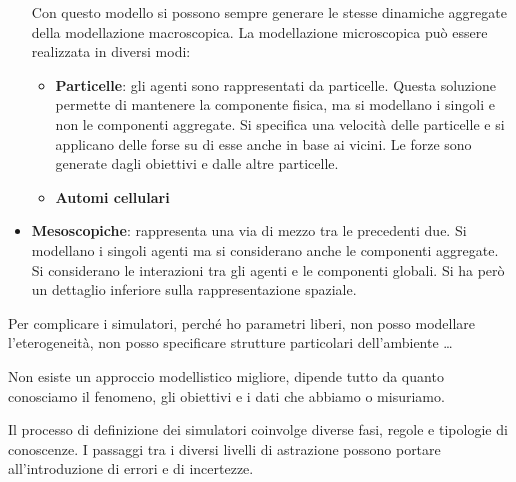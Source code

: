 \begin{itemize}
            Con questo modello si possono sempre generare le stesse dinamiche
            aggregate della modellazione macroscopica. La modellazione
            microscopica può essere realizzata in diversi modi:
            \begin{itemize}
                  \item \textbf{Particelle}: gli agenti sono rappresentati da
                        particelle. Questa soluzione permette di mantenere la
                        componente fisica, ma si modellano i singoli e non le
                        componenti aggregate. Si specifica una velocità delle
                        particelle e si applicano delle forse su di esse anche in
                        base ai vicini. Le forze sono generate dagli obiettivi e dalle
                        altre particelle.
                  \item \textbf{Automi cellulari}
            \end{itemize}
      \item \textbf{Mesoscopiche}: rappresenta una via di mezzo tra le precedenti
            due. Si modellano i singoli agenti ma si considerano anche le componenti
            aggregate. Si considerano le interazioni tra gli agenti e le componenti
            globali. Si ha però un dettaglio inferiore sulla rappresentazione
            spaziale.
\end{itemize}
Per complicare i simulatori, perché ho parametri liberi, non posso modellare
l'eterogeneità, non posso specificare strutture particolari dell'ambiente \dots
\begin{nota}
      Non esiste un approccio modellistico migliore, dipende tutto da quanto
      conosciamo il fenomeno, gli obiettivi e i dati che abbiamo o misuriamo.
\end{nota}
Il processo di definizione dei simulatori coinvolge diverse fasi, regole e
tipologie di conoscenze. I passaggi tra i diversi livelli di astrazione possono
portare all'introduzione di errori e di incertezze.